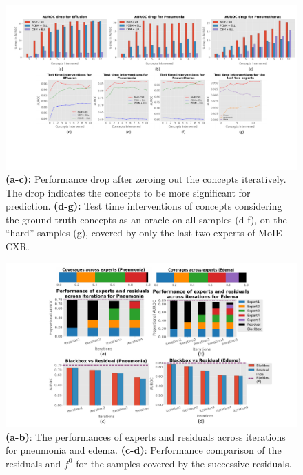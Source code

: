 \documentclass[runningheads]{llncs}
\begin{document}
\begin{figure}[h]
\begin{center}
\centerline{\includegraphics[width=\linewidth]{plots/supp/Supp_Quant_concepts.pdf}}
\caption{\textbf{(a-c):} Performance drop after zeroing out the concepts iteratively. The drop indicates the concepts to be more significant for prediction. \textbf{(d-g):} Test time interventions of concepts considering the ground truth concepts as an oracle on all samples (d-f), on the ``hard'' samples (g), covered by only the last two experts of MoIE-CXR.}
\label{fig:expert_performance_cv_vit}
\end{center}
\end{figure}

\begin{figure}[h]
\begin{center}
\centerline{\includegraphics[width=\linewidth]{plots/supp/Supp_Experts.pdf}}
\caption{\textbf{(a-b)}: The performances of experts and residuals across iterations for pneumonia and edema. \textbf{(c-d)}: Performance comparison of the residuals and $f^0$ for the samples covered by the successive residuals.
}
\label{fig:expert_performance_cv_vit}
\end{center}
\end{figure}
\end{document}
